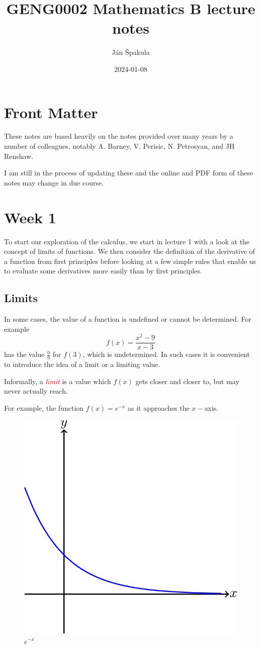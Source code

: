 \documentclass[
  11pt,
  oneside]{book}
\title{GENG0002 Mathematics B lecture notes}
\author{Ján Špakula}
\date{2024-01-08}
\newcommand{\slide}{}
\theoremstyle{definition}
\theoremstyle{definition}
\theoremstyle{definition}
\theoremstyle{definition}
\theoremstyle{remark}
\begin{document}
\maketitle

{
\setcounter{tocdepth}{1}
\tableofcontents
}
\chapter*{Front Matter}\label{front-matter}

These notes are based heavily on the notes provided over many years by a number of colleagues, notably A. Barney, V. Perisic, N. Petrosyan, and JH Renshaw.

I am still in the process of updating these and the online and PDF form of these notes may change in due course.

\chapter{Week 1}\label{week-one}

To start our exploration of the calculus, we start in lecture 1 with a look at the concept of limits of functions. We then consider the definition of the derivative of a function from first principles before looking at a few simple rules that enable us to evaluate some derivatives more easily than by first principles.
\slide

\section{Limits}\label{lecture-one}

In some cases, the value of a function is undefined or cannot be determined. For example
\[
f(x) = \frac{x^2-9}{x-3}\tag{1}
\]
has the value \(\frac00\) for \(f(3)\), which is undetermined. In such cases it is convenient to introduce the idea of a limit or a limiting value.

Informally, a \textcolor{red}{\em limit} is a value which \(f(x)\) gets closer and closer to, but may never actually reach.

\slide

For example, the function \(f(x) = e^{-x}\) as it approaches the \(x-\)axis.

\begin{figure}

{\centering \includegraphics[width=0.4\linewidth]{tikztopng-figure0} 

}

\caption{$e^{-x}$}\label{fig:unnamed-chunk-3}
\end{figure}
\end{document}
